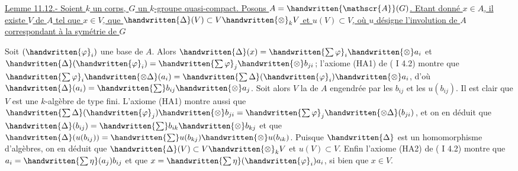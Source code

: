

\uline{Lemme 11.12.- Soient $k$ un corps, $G$ un $k$-groupe quasi-compact. Posons $A=\handwritten{\mathscr{A}}(G)$. Etant donné $x\in A$, il existe  $V$ de $A$ tel que $x\in V$, que $\handwritten{\Delta}(V)\subset V\handwritten{\otimes}_k V$ et $u(V)\subset V$, où $u$ désigne l'involution de $A$ correspondant à la symétrie de $G$}


Soit $(\handwritten{\varphi}_i)$ une base de $A$. Alors $\handwritten{\Delta}(x)=\handwritten{\sum\varphi}_i\handwritten{\otimes}a_i$ et $\handwritten{\Delta}(\handwritten{\varphi}_i)=\handwritten{\sum\varphi}_j\handwritten{\otimes}b_{ji}$; l'axiome (HA1) de ( I 4.2) montre que $\handwritten{\sum\varphi}_i\handwritten{\otimes\Delta}(a_i)=\handwritten{\sum\Delta}(\handwritten{\varphi}_i)\handwritten{\otimes}a_i$, d'où $\handwritten{\Delta}(a_i)=\handwritten{\sum}b_{ij}\handwritten{\otimes}a_j$. Soit alors $V$ la  de $A$ engendrée par les $b_{ij}$ et les $u(b_{ij})$. Il est clair que $V$ est une $k$-algèbre de type fini. L'axiome (HA1) montre aussi que $\handwritten{\sum\Delta}(\handwritten{\varphi}_j)\handwritten{\otimes}b_{ji}=\handwritten{\sum\varphi}_j\handwritten{\otimes\Delta}(b_{ji})$, et on en déduit que $\handwritten{\Delta}(b_{ij})=\handwritten{\sum}b_{ik}\handwritten{\otimes}b_{kj}$ et que $\handwritten{\Delta}(u(b_{ij}))=\handwritten{\sum}u(b_{kj})\handwritten{\otimes}u(b_{ik})$. Puisque $\handwritten{\Delta}$ est un homomorphisme d'algèbres, on en déduit que $\handwritten{\Delta}(V)\subset V\handwritten{\otimes}_k V$ et $u(V)\subset V$. Enfin l'axiome (HA2) de ( I 4.2) montre que $a_i=\handwritten{\sum\eta}(a_j)b_{ij}$ et que $x=\handwritten{\sum\eta}(\handwritten{\varphi}_i)a_i$, si bien que $x\in V$.

